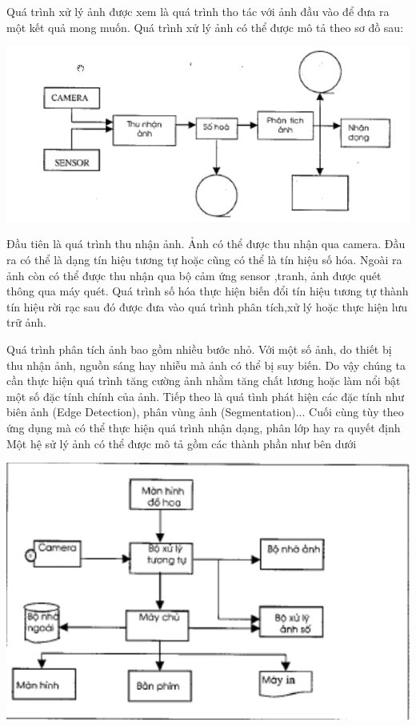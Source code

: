 \documentclass[12pt,oneside,a4]{report}
\begin{document}
Quá trình xử lý ảnh được xem là quá trình tho tác với ảnh đầu vào để đưa ra một kết quả mong muốn. Quá trình xử lý ảnh có thể được mô tả theo sơ đồ sau:
\begin{center}
\includegraphics[scale=0.7]{figure/htxulyanh.png}
\end{center}
Đầu tiên là quá trình thu nhận ảnh. Ảnh có thể được thu nhận qua camera. Đầu ra có thể là dạng tín hiệu tương tự hoặc cũng có thể là tín hiệu số hóa. Ngoài ra ảnh còn có thể được thu nhận qua bộ cảm ứng sensor ,tranh, ảnh được quét thông qua máy quét.
Quá trình số hóa thực hiện biến đổi tín hiệu tương tự thành tín hiệu rời rạc sau đó được đưa vào quá trình phân tích,xử lý hoặc thực hiện lưu trữ ảnh.

Quá trình phân tích ảnh bao gồm nhiều bước nhỏ. Với một số ảnh, do thiết bị thu nhận ảnh, nguồn sáng hay nhiễu mà ảnh có thể bị suy biến. Do vậy chúng ta cần thực hiện quá trình tăng cường ảnh nhằm tăng chất lương hoặc làm nổi bật một số đặc tính chính của ảnh. Tiếp theo là quá tình phát hiện các đặc tính như biên ảnh (Edge Detection), phân vùng ảnh (Segmentation)...
Cuối cùng tùy theo ứng dụng mà có thể thực hiện quá trình nhận dạng, phân lớp hay ra quyết định 
Một hệ sử lý ảnh có thể được mô tả gồm các thành phần như bên dưới
\begin{center}
\includegraphics[]{figure/tpxulyanh.png}
\end{center}
\end{document}
